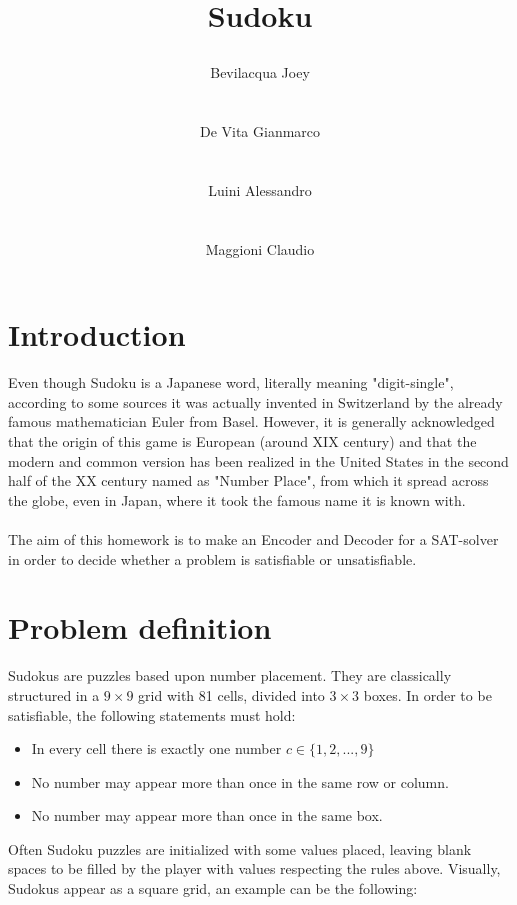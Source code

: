 \documentclass[]{usiinfprospectus}
\author{\centerline{Bevilacqua Joey} \\[3pt] \centerline{De Vita Gianmarco}  \\[3pt] \centerline{Luini Alessandro}  \\[3pt] \centerline{Maggioni Claudio}}
\title{\centerline{Sudoku}}
\newcounter{row}
\newcounter{col}
\begin{document}
\maketitle
\tableofcontents
\newpage
\section{Introduction} \label{introduction}
Even though Sudoku is a Japanese word, literally meaning "digit-single", according to some sources it was actually invented in Switzerland by the already famous mathematician Euler from Basel. However, it is generally acknowledged that the origin of this game is European (around XIX century) and that the modern and common version has been realized in the United States in the second half of the XX century named as "Number Place", from which it spread across the globe, even in Japan, where it took the famous name it is known with.\\ \\
The aim of this homework is to make an Encoder and Decoder for a SAT-solver in order to decide whether a problem is satisfiable or unsatisfiable. 
\newpage
\section{Problem definition} \label{problem}
Sudokus are puzzles based upon number placement. They are classically structured in a $9\times 9$ grid with 81 cells, divided into $3\times 3$ boxes. In order to be satisfiable, the following statements must hold:
\begin{itemize}%
\item In every cell there is exactly one number $c \in \{1, 2, ..., 9 \}$
\item No number may appear more than once in the same row or column.
\item No number may appear more than once in the same box.
\end{itemize}
Often Sudoku puzzles are initialized with some values placed, leaving blank spaces to be filled by the player with values respecting the rules above. Visually, Sudokus appear as a square grid, an example can be the following:
\end{document}
